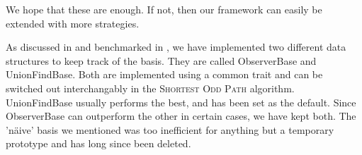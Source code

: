 We hope that these are enough. If not, then our framework can easily be extended with more strategies.

As discussed in  and benchmarked in , we have implemented two different data structures to keep track of the basis. They are called ObserverBase and UnionFindBase. Both are implemented using a common trait and can be switched out interchangably in the \textsc{Shortest Odd Path} algorithm. UnionFindBase usually performs the best, and has been set as the default. Since ObserverBase can outperform the other in certain cases, we have kept both. The 'näive' basis we mentioned was too inefficient for anything but a temporary prototype and has long since been deleted.
